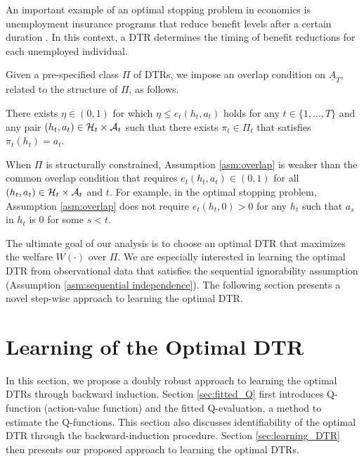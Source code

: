 An important example of an optimal stopping problem in economics is unemployment insurance programs that reduce benefit levels after a certain duration \citep[e.g.,][]{Meyer_1995,Kolsrud_et_al_2018}. In this context, a DTR determines the timing of benefit reductions for each unemployed individual.

Given a pre-specified class $\Pi$ of DTRs, we impose an overlap condition on $\underline{A}_{T}$, related to the structure of $\Pi$, as follows.

\medskip

\begin{assumption}\label{asm:overlap} 
There exists $\eta \in (0,1)$ for which $\eta \leq e_{t}(h_{t},a_{t})$ holds for any $t \in \{1,\ldots,T\}$ and any pair  $(h_{t},a_{t}) \in \mathcal{H}_{t} \times \mathcal{A}_{t}$ such that there exists $\pi_{t} \in \Pi_{t}$ that satisfies $\pi_{t}(h_t) = a_{t}$. 
\end{assumption}

\medskip

When $\Pi$ is structurally constrained, Assumption \ref{asm:overlap} is weaker than the common overlap condition that requires $e_{t}(h_t, a_t) \in (0, 1)$ for all $(h_t, a_t) \in \mathcal{H}_{t} \times \mathcal{A}_{t}$ and $t$. For example, in the optimal stopping problem, Assumption  \ref{asm:overlap} does not require $e_{t}(h_t, 0) > 0$ for any $h_t$ such that $a_s$ in $h_t$ is 0 for some $s < t$.

The ultimate goal of our analysis is to choose an optimal DTR that maximizes the welfare $W\left(\cdot\right)$ over $\Pi$. 
We are especially interested in learning the optimal DTR from observational data that satisfies the sequential ignorability assumption (Assumption \ref{asm:sequential independence}). The following section presents a novel step-wise approach to learning the optimal DTR.



\section{Learning of the Optimal DTR}\label{sec:doubly_robust_policy_learning}

In this section, we propose a doubly robust approach to learning the optimal DTRs through backward induction. Section \ref{sec:fitted_Q} first introduces Q-function (action-value function) and the fitted Q-evaluation, a method to estimate the Q-functions. This section also discusses identifiability of the optimal DTR through the backward-induction procedure. 
Section \ref{sec:learning_DTR} then presents our proposed approach to learning the optimal DTRs.

